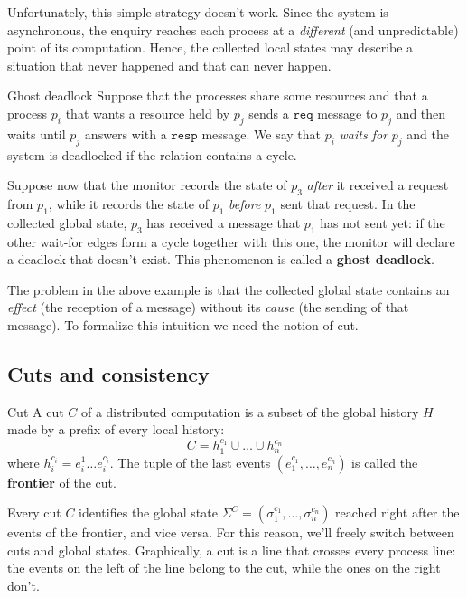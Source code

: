 Unfortunately, this simple strategy doesn't work. Since the system is asynchronous, the enquiry reaches each process at a \textit{different} (and unpredictable) point of its computation. Hence, the collected local states may describe a situation that never happened and that can never happen.

\begin{framedex}{Ghost deadlock}
  Suppose that the processes share some resources and that a process $p_i$ that wants a resource held by $p_j$ sends a $\texttt{req}$ message to $p_j$ and then waits until $p_j$ answers with a $\texttt{resp}$ message. We say that $p_i$ \textit{waits for} $p_j$ and the system is deadlocked if the  relation contains a cycle.

  Suppose now that the monitor records the state of $p_3$ \textit{after} it received a request from $p_1$, while it records the state of $p_1$ \textit{before} $p_1$ sent that request. In the collected global state, $p_3$ has received a message that $p_1$ has not sent yet: if the other wait-for edges form a cycle together with this one, the monitor will declare a deadlock that doesn't exist. This phenomenon is called a \textbf{ghost deadlock}.
\end{framedex}

The problem in the above example is that the collected global state contains an \textit{effect} (the reception of a message) without its \textit{cause} (the sending of that message). To formalize this intuition we need the notion of cut.

\subsection{Cuts and consistency}

\begin{frameddefn}{Cut}
  A cut $C$ of a distributed computation is a subset of the global history $H$ made by a prefix of every local history:
  \[C = h_1^{c_1} \cup \ldots \cup h_n^{c_n}\]
  where $h_i^{c_i} = e_i^1 \ldots e_i^{c_i}$. The tuple of the last events $(e_1^{c_1}, \ldots, e_n^{c_n})$ is called the \textbf{frontier} of the cut.
\end{frameddefn}

Every cut $C$ identifies the global state $\Sigma^C = (\sigma_1^{c_1}, \ldots, \sigma_n^{c_n})$ reached right after the events of the frontier, and vice versa. For this reason, we'll freely switch between cuts and global states. Graphically, a cut is a line that crosses every process line: the events on the left of the line belong to the cut, while the ones on the right don't.

